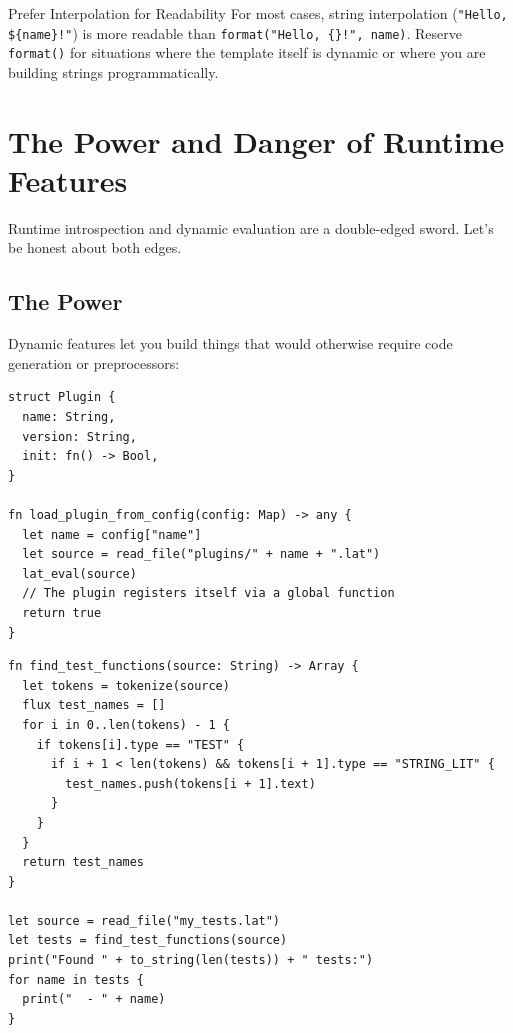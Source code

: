 \begin{tipbox}{Prefer Interpolation for Readability}
For most cases, string interpolation (\lstinline|"Hello, ${name}!"|) is more readable than \lstinline|format("Hello, {}!", name)|.
Reserve \lstinline|format()| for situations where the template itself is dynamic or where you are building strings programmatically.
\end{tipbox}

\section{The Power and Danger of Runtime Features}\label{sec:power-danger}


Runtime introspection and dynamic evaluation are a double-edged sword.
Let's be honest about both edges.

\subsection{The Power}

Dynamic features let you build things that would otherwise require code generation or preprocessors:

\begin{lstlisting}[language=Lattice, caption={A configuration-driven plugin system}]
struct Plugin {
  name: String,
  version: String,
  init: fn() -> Bool,
}

fn load_plugin_from_config(config: Map) -> any {
  let name = config["name"]
  let source = read_file("plugins/" + name + ".lat")
  lat_eval(source)
  // The plugin registers itself via a global function
  return true
}
\end{lstlisting}

\begin{lstlisting}[language=Lattice, caption={A test runner that discovers tests}]
fn find_test_functions(source: String) -> Array {
  let tokens = tokenize(source)
  flux test_names = []
  for i in 0..len(tokens) - 1 {
    if tokens[i].type == "TEST" {
      if i + 1 < len(tokens) && tokens[i + 1].type == "STRING_LIT" {
        test_names.push(tokens[i + 1].text)
      }
    }
  }
  return test_names
}

let source = read_file("my_tests.lat")
let tests = find_test_functions(source)
print("Found " + to_string(len(tests)) + " tests:")
for name in tests {
  print("  - " + name)
}
\end{lstlisting}

